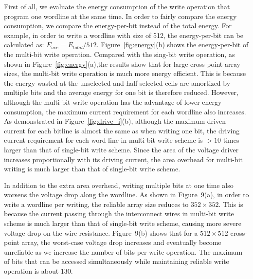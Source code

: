 First of all, we evaluate the energy consumption of the write operation
that program one wordline at the same time. In order to fairly compare the
energy consumption, we compare the energy-per-bit instead of the total
energy. For example, in order to write a wordline with size of 512, the
energy-per-bit can be calculated as: $E_{ave}=E_{total}/512$.
Figure~\ref{fig:energy}(b) shows the energy-per-bit of the multi-bit write
operation. Compared with the sing-bit write operation, as shown in Figure~\ref{fig:energy}(a),the results
show that for large cross point array sizes, the multi-bit write operation
is much more energy efficient. This is because the energy wasted at the
unselected and half-selected cells are amortized by multiple bits and the
average energy for one bit is therefore reduced. However, although the
multi-bit write operation has the advantage of lower energy consumption,
the maximum current requirement for each wordline also increases. As demonstrated
in Figure~\ref{fig:drive_i}(b), although the maximum driven current for each
bitline is almost the same as when writing one bit, the driving
current requirement for each word line in multi-bit write scheme is $>10$ times larger than that of single-bit
write scheme. Since the area of the voltage driver increases proportionally
with its driving current, the area overhead for multi-bit writing is much larger than that of single-bit write scheme.



In addition to the extra area overhead, writing multiple bits at one time
also worsens the voltage drop along the wordline. As shown in Figure~9(a),
in order to write a wordline per writing, the reliable array size reduces
to $352 \times 352$. This is because the current passing through the
interconnect wires in multi-bit write scheme is much larger than that of
single-bit write scheme, causing more severe voltage drop on the wire
resistance. Figure~9(b) shows that for a $512\times 512$ cross-point
array, the worst-case voltage drop increases and eventually become
unreliable as we increase the number of bits per write operation. The
maximum of bits that can be accessed simultaneously while maintaining
reliable write operation is about 130.

